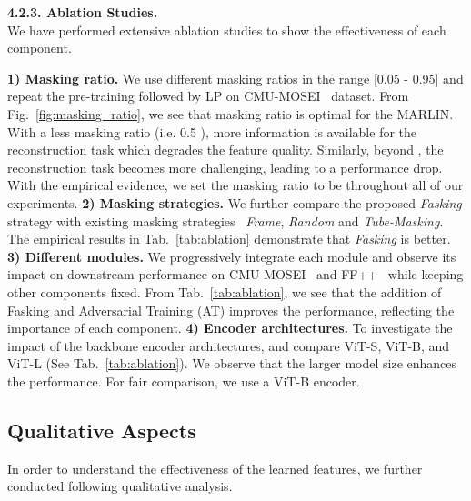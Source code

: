 \documentclass[10pt,twocolumn,letterpaper]{article}
\begin{document}
\noindent \textbf{4.2.3. Ablation Studies.}\\
We have performed extensive ablation studies to show the effectiveness of each component.

\noindent \textbf{1) Masking ratio.}
We use different masking ratios in the range [0.05 - 0.95] and repeat the pre-training followed by LP on CMU-MOSEI~\cite{zadehMultiattention2018a} dataset. From Fig.~\ref{fig:masking_ratio}, we see that  masking ratio is optimal for the MARLIN. With a less masking ratio (i.e.  0.5 ), more information is available for the reconstruction task which degrades the feature quality. Similarly, beyond , the reconstruction task becomes more challenging, leading to a performance drop. With the empirical evidence, we set the masking ratio to be  throughout all of our experiments.
\textbf{2) Masking strategies.}
We further compare the proposed \textit{Fasking} strategy with existing masking strategies~\cite{tongVideoMAE2022,feichtenhoferMasked2022} \ie \textit{Frame}, \textit{Random} and \textit{Tube-Masking}. The empirical results in Tab.~\ref{tab:ablation} demonstrate that \textit{Fasking} is better.
\textbf{3) Different modules.} We progressively integrate each module and observe its impact on downstream performance on CMU-MOSEI~\cite{zadehMultiattention2018a} and FF++~\cite{rosslerFaceForensics2019} while keeping other components fixed. From Tab.~\ref{tab:ablation}, we see that the addition of Fasking and Adversarial Training (AT) improves the performance, reflecting the importance of each component. 
\textbf{4) Encoder architectures.} To investigate the impact of the backbone encoder architectures, and compare ViT-S, ViT-B, and ViT-L (See Tab.~\ref{tab:ablation}). We observe that the larger model size enhances the performance. For fair comparison, we use a ViT-B encoder.

\vspace{-1mm}
\subsection{Qualitative Aspects}\label{sec:qualitative}
\vspace{-1mm}
\noindent In order to understand the effectiveness of the learned features, we further conducted following qualitative analysis.
\end{document}
